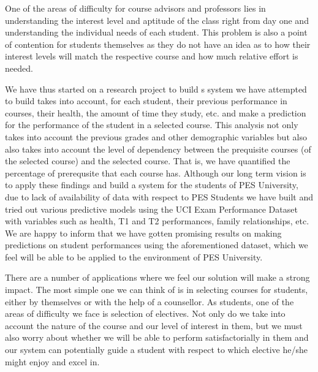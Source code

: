 \documentclass[conference]{IEEEtran}
\begin{document}
One of the areas of difficulty for course advisors and professors lies in understanding the interest level and aptitude of the class right from day one and understanding the individual needs of each student. This problem is also a point of contention for students themselves as they do not have an idea as to how their interest levels will match the respective course and how much relative effort is needed. 

We have thus started on a research project to build s system we have attempted to build takes into account, for each student, their previous performance in courses, their health, the amount of time they study, etc. and make a prediction for the performance of the student in a selected course. This analysis not only takes into account the previous grades and other demographic variables but also also takes into account the level of dependency between the prequisite courses (of the selected course) and the selected course. That is, we have quantified the percentage of prerequsite that each course has. Although our long term vision is to apply these findings and build a system for the students of PES University, due to lack of availability of data with respect to PES Students we have built and tried out various predictive models using the UCI Exam Performance Dataset \cite{Lichman:2013}\cite{ref:4} with variables such as health, T1 and T2 performances, family relationships, etc. We are happy to inform that we have gotten promising results on making predictions on student performances using the aforementioned dataset, which we feel will be able to be applied to the environment of PES University.


There are a number of applications where we feel our solution will make a strong impact. The most simple one we can think of is in selecting courses for students, either by themselves or with the help of a counsellor. As students, one of the areas of difficulty we face is selection of electives. Not only do we take into account the nature of the course and our level of interest in them, but we must also worry about whether we will be able to perform satisfactorially in them and our system can potentially guide a student with respect to which elective he/she might enjoy and excel in.
\end{document}
